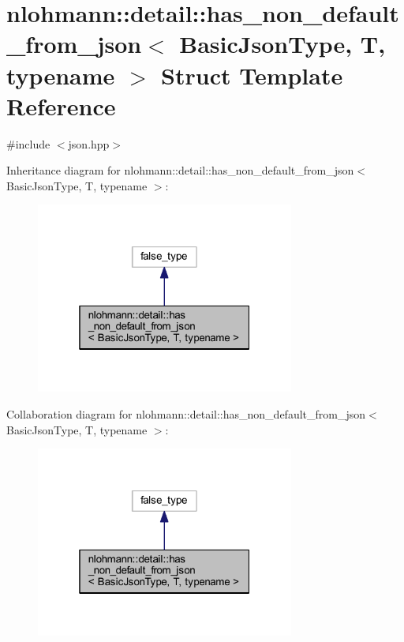 \hypertarget{structnlohmann_1_1detail_1_1has__non__default__from__json}{}\section{nlohmann\+::detail\+::has\+\_\+non\+\_\+default\+\_\+from\+\_\+json$<$ Basic\+Json\+Type, T, typename $>$ Struct Template Reference}
\label{structnlohmann_1_1detail_1_1has__non__default__from__json}


{\ttfamily \#include $<$json.\+hpp$>$}



Inheritance diagram for nlohmann\+::detail\+::has\+\_\+non\+\_\+default\+\_\+from\+\_\+json$<$ Basic\+Json\+Type, T, typename $>$\+:
\nopagebreak
\begin{figure}[H]
\begin{center}
\leavevmode
\includegraphics[width=241pt]{structnlohmann_1_1detail_1_1has__non__default__from__json__inherit__graph}
\end{center}
\end{figure}


Collaboration diagram for nlohmann\+::detail\+::has\+\_\+non\+\_\+default\+\_\+from\+\_\+json$<$ Basic\+Json\+Type, T, typename $>$\+:
\nopagebreak
\begin{figure}[H]
\begin{center}
\leavevmode
\includegraphics[width=241pt]{structnlohmann_1_1detail_1_1has__non__default__from__json__coll__graph}
\end{center}
\end{figure}


